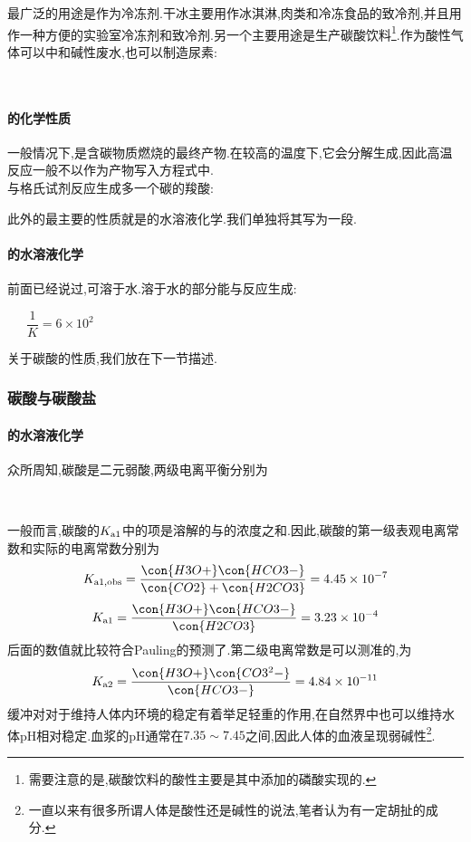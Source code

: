 \documentclass{ctexart}
\begin{document}
\indent {}最广泛的用途是作为冷冻剂.干冰主要用作冰淇淋,肉类和冷冻食品的致冷剂,并且用作一种方便的实验室冷冻剂和致冷剂.另一个主要用途是生产碳酸饮料\footnote{需要注意的是,碳酸饮料的酸性主要是其中添加的磷酸实现的.}.作为酸性气体可以中和碱性废水,也可以制造尿素:
\begin{center}
    \\
\end{center}
\paragraph{的化学性质}
一般情况下,是含碳物质燃烧的最终产物.在较高的温度下,它会分解生成,因此高温反应一般不以作为产物写入方程式中.\\
\indent {}与格氏试剂反应生成多一个碳的羧酸:
\begin{center}
\end{center}

\indent 此外的最主要的性质就是的水溶液化学.我们单独将其写为一段.
\paragraph{的水溶液化学}
前面已经说过,可溶于水.溶于水的部分能与反应生成:
\begin{center}
    \ \ \ $\dfrac{1}{K}=6\times10^2$
\end{center}
关于碳酸的性质,我们放在下一节描述.
\subsubsection{碳酸与碳酸盐}
\paragraph{的水溶液化学}
众所周知,碳酸是二元弱酸,两级电离平衡分别为
\begin{center}
    \\
\end{center}
一般而言,碳酸的$K_{\text a1}$中的\ce{[H2CO3]}项是溶解的与的浓度之和.因此,碳酸的第一级表观电离常数和实际的电离常数分别为
\[K_{\text{a}1,\text{obs}}=\dfrac{\con{H3O+}\con{HCO3-}}{\con{CO2}+\con{H2CO3}}=4.45\times10^{-7}\]
\[K_{\text a1}=\dfrac{\con{H3O+}\con{HCO3-}}{\con{H2CO3}}=3.23\times10^{-4}\]
后面的数值就比较符合Pauling的预测了.第二级电离常数是可以测准的,为
\[K_{\text a2}=\dfrac{\con{H3O+}\con{CO3^2-}}{\con{HCO3-}}=4.84\times10^{-11}\]
缓冲对对于维持人体内环境的稳定有着举足轻重的作用,在自然界中也可以维持水体pH相对稳定.血浆的pH通常在$7.35\sim7.45$之间,因此人体的血液呈现弱碱性\footnote{一直以来有很多所谓人体是酸性还是碱性的说法,笔者认为有一定胡扯的成分.}.
\end{document}
